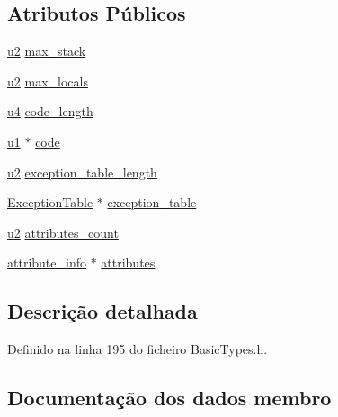 \subsection*{Atributos Públicos}
\begin{DoxyCompactItemize}
\item 
\hyperlink{BasicTypes_8h_a732cde1300aafb73b0ea6c2558a7a54f}{u2} \hyperlink{structCode__attribute_a300885ff1326f01f7c86e7b4425f0d35}{max\+\_\+stack}
\item 
\hyperlink{BasicTypes_8h_a732cde1300aafb73b0ea6c2558a7a54f}{u2} \hyperlink{structCode__attribute_ad710ec86a1d37c6daa999383f8f2fd35}{max\+\_\+locals}
\item 
\hyperlink{BasicTypes_8h_ae5be1f726785414dd1b77d60df074c9d}{u4} \hyperlink{structCode__attribute_a80af47e824a13ef4dc604e5b8671f793}{code\+\_\+length}
\item 
\hyperlink{BasicTypes_8h_ad9f4cdb6757615aae2fad89dab3c5470}{u1} $\ast$ \hyperlink{structCode__attribute_a26d83aeded05528b11dd486555d1ece2}{code}
\item 
\hyperlink{BasicTypes_8h_a732cde1300aafb73b0ea6c2558a7a54f}{u2} \hyperlink{structCode__attribute_a24b063ad994d77688db7468fae11e7aa}{exception\+\_\+table\+\_\+length}
\item 
\hyperlink{structExceptionTable}{Exception\+Table} $\ast$ \hyperlink{structCode__attribute_a080b3f7a5717321484a648ec83c11f12}{exception\+\_\+table}
\item 
\hyperlink{BasicTypes_8h_a732cde1300aafb73b0ea6c2558a7a54f}{u2} \hyperlink{structCode__attribute_a9ca1435aa65ae02d764ff53a36fb842f}{attributes\+\_\+count}
\item 
\hyperlink{structattribute__info}{attribute\+\_\+info} $\ast$ \hyperlink{structCode__attribute_abb5d2d93e2f165dd908c3788a323d093}{attributes}
\end{DoxyCompactItemize}


\subsection{Descrição detalhada}


Definido na linha 195 do ficheiro Basic\+Types.\+h.



\subsection{Documentação dos dados membro}
\mbox{\label{structCode__attribute_abb5d2d93e2f165dd908c3788a323d093}} 
